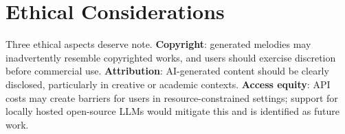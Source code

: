\section{Ethical Considerations}
\label{sec:ev-ethics}

Three ethical aspects deserve note. \textbf{Copyright}: generated melodies
may inadvertently resemble copyrighted works, and users should exercise
discretion before commercial use. \textbf{Attribution}: AI-generated content
should be clearly disclosed, particularly in creative or academic contexts.
\textbf{Access equity}: API costs may create barriers for users in
resource-constrained settings; support for locally hosted open-source LLMs
would mitigate this and is identified as future work.
